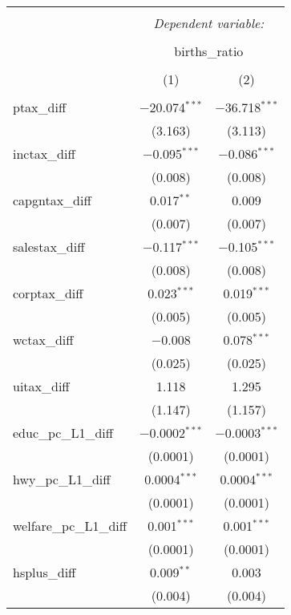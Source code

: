 
\begin{table}[!htbp] \centering 
  \caption{} 
  \label{} 
\begin{tabular}{@{\extracolsep{5pt}}lcc} 
\\[-1.8ex]\hline 
\hline \\[-1.8ex] 
 & \multicolumn{2}{c}{\textit{Dependent variable:}} \\ 
\cline{2-3} 
\\[-1.8ex] & \multicolumn{2}{c}{births\_ratio} \\ 
\\[-1.8ex] & (1) & (2)\\ 
\hline \\[-1.8ex] 
 ptax\_diff & $-$20.074$^{***}$ & $-$36.718$^{***}$ \\ 
  & (3.163) & (3.113) \\ 
  inctax\_diff & $-$0.095$^{***}$ & $-$0.086$^{***}$ \\ 
  & (0.008) & (0.008) \\ 
  capgntax\_diff & 0.017$^{**}$ & 0.009 \\ 
  & (0.007) & (0.007) \\ 
  salestax\_diff & $-$0.117$^{***}$ & $-$0.105$^{***}$ \\ 
  & (0.008) & (0.008) \\ 
  corptax\_diff & 0.023$^{***}$ & 0.019$^{***}$ \\ 
  & (0.005) & (0.005) \\ 
  wctax\_diff & $-$0.008 & 0.078$^{***}$ \\ 
  & (0.025) & (0.025) \\ 
  uitax\_diff & 1.118 & 1.295 \\ 
  & (1.147) & (1.157) \\ 
  educ\_pc\_L1\_diff & $-$0.0002$^{***}$ & $-$0.0003$^{***}$ \\ 
  & (0.0001) & (0.0001) \\ 
  hwy\_pc\_L1\_diff & 0.0004$^{***}$ & 0.0004$^{***}$ \\ 
  & (0.0001) & (0.0001) \\ 
  welfare\_pc\_L1\_diff & 0.001$^{***}$ & 0.001$^{***}$ \\ 
  & (0.0001) & (0.0001) \\ 
  hsplus\_diff & 0.009$^{**}$ & 0.003 \\ 
  & (0.004) & (0.004) \\ 

\end{tabular}
\end{table}
